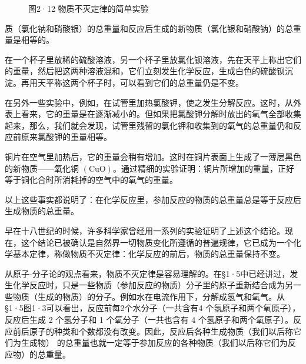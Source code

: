 \begin{figure}
{%
}
\caption{图2·12 物质不灭定律的简单实验}
\end{figure}

质（氯化钠和硝酸银）的总重量和反应后生成的新物质（氯化银和硝酸钠）的总重量是相等的。

在一个杯子里放稀的硫酸溶液，另一个杯子里放氯化钡溶液，先在天平上称出它们的重量，然后把这两种溶液混和，它们立刻发生化学反应，生成白色的硫酸钡沉淀。再用天平称这两个杯子时，可以看到它们的总重量仍是不变。

在另外一些实验中，例如，在试管里加热氯酸钾，使之发生分解反应。这时，从外表上看来，它的重量是在逐渐减小的。但如果把氯酸钾分解时放出的氧气全部收集起来，那么，我们就会发现，试管里残留的氯化钾和收集到的氧气的总重量仍和反应前原来氯酸钾的重量相等。

铜片在空气里加热后，它的重量会稍有增加。这时在铜片表面上生成了一薄层黑色的新物质------氧化铜
\(\left(\mathrm{CuO}\right)\)。通过精细的实验证明：铜片所增加的重量，正好等于铜化合时所消耗掉的空气中的氧气的重量。

以上这些事实都说明了：在化学反应里，参加反应的物质的总重量总是等于反应后生成物质的总重量。

早在十八世纪的时候，许多科学家曾经用一系列的实验证明了上述这个结论。现在，这个结论已被确认是自然界一切物质变化所遵循的普遍规律，它已成为一个化学基本定律，称做物质不灭定律：化学反应的前后，物质的总重量保持不变。

从原子-分子论的观点看来，物质不灭定律是容易理解的。在§1·5中已经讲过，发生化学反应时，只是一些物质（参加反应的物质）分子里的原子重新结合成为另一些物质（生成的物质）的分子。例如水在电流作用下，分解成氢气和氧气。从§1·5图1·3可以看出，反应前每2个水分子（一共含有4
个氢原子和两个氧原子），反应后生成 2 个氢分子和 1 个氧分子（一共也含有 4
个氢原子和两个氧原子）。反应前后原子的种类和个数都没有改变。因此，反应后各种生成物质（我们以后称它们为生成物）
的总重量也就一定等于参加反应的各种物质（我们以后称它们为反应物）的总重量。


